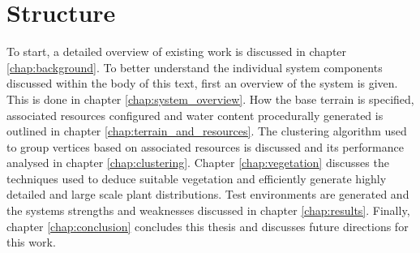 \section{Structure}

To start, a detailed overview of existing work is discussed in chapter \ref{chap:background}. To better understand the individual system components discussed within the body of this text, first an overview of the system is given. This is done in chapter \ref{chap:system_overview}. How the base terrain is specified, associated resources configured and water content procedurally generated is outlined in chapter \ref{chap:terrain_and_resources}. The clustering algorithm used to group vertices based on associated resources is discussed and its performance analysed in chapter \ref{chap:clustering}. Chapter \ref{chap:vegetation} discusses the techniques used to deduce suitable vegetation and efficiently generate highly detailed and large scale plant distributions. Test environments are generated and the systems strengths and weaknesses discussed in chapter \ref{chap:results}. Finally, chapter \ref{chap:conclusion} concludes this thesis and discusses future directions for this work.
